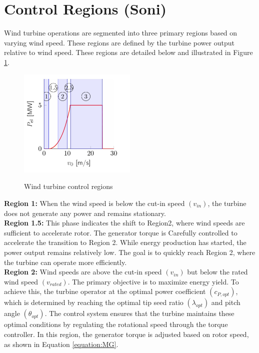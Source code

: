 \section{Control Regions (Soni)} \label{control regions}

Wind turbine operations are segmented into three primary regions based on varying wind speed. These regions are defined by the turbine power output relative to wind speed. These regions are detailed below and illustrated in Figure \ref{fig:control regions}.

\begin{figure}[htbp]
	\centering
	\includegraphics[width=0.5\textwidth]{Figures/Figure_2.jpg}
	\caption{Wind turbine control regions}
	\label{fig:control regions} \cite{2024}
\end{figure}

\textbf{Region 1:} When the wind speed is below the cut-in speed $(v_{in})$, the turbine does not generate any power and remains stationary.
\\[16pt]
\textbf{Region 1.5:} This phase indicates the shift to Region2, where wind speeds are sufficient to accelerate rotor. The generator torque is Carefully controlled to accelerate the transition to Region 2. While energy production has started, the power output remains relatively low. The goal is to quickly reach Region 2, where the turbine can operate more efficiently. 
\\[16pt]
\textbf{Region 2:} Wind speeds are above the cut-in speed $(v_{in})$ but below the rated wind speed $(v_{rated})$. The primary objective is to maximize energy yield. To achieve this, the turbine operator at the optimal power coefficient $(c_{P,opt})$, which is determined by reaching the optimal tip seed ratio $(\lambda_{opt})$ and pitch angle $(\theta_{opt})$. The control system ensures that the turbine maintains these optimal conditions by regulating the rotational speed through the torque controller. In this region, the generator torque is adjusted based on rotor speed, as shown in Equation \ref{equation:MG}.

